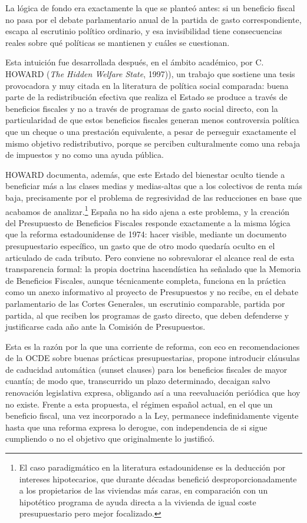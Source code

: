 \documentclass[10pt,a4paper]{article}
\newcounter{anexo}
\begin{document}
La lógica de fondo era exactamente la que se planteó antes: si un beneficio fiscal no pasa por el debate parlamentario anual de la partida de gasto correspondiente, escapa al escrutinio político ordinario, y esa invisibilidad tiene consecuencias reales sobre qué políticas se mantienen y cuáles se cuestionan.

Esta intuición fue desarrollada después, en el ámbito académico, por C. HOWARD (\textit{The Hidden Welfare State}, 1997)), un trabajo que sostiene una tesis provocadora y muy citada en la literatura de política social comparada: buena parte de la redistribución efectiva que realiza el Estado se produce a través de beneficios fiscales y no a través de programas de gasto social directo, con la particularidad de que estos beneficios fiscales generan menos controversia política que un cheque o una prestación equivalente, a pesar de perseguir exactamente el mismo objetivo redistributivo, porque se perciben culturalmente como una rebaja de impuestos y no como una ayuda pública.

HOWARD documenta, además, que este Estado del bienestar oculto tiende a beneficiar más a las clases medias y medias-altas que a los colectivos de renta más baja, precisamente por el problema de regresividad de las reducciones en base que acabamos de analizar.\footnote{%
    El caso paradigmático en la literatura estadounidense es la deducción por intereses hipotecarios, que durante décadas benefició desproporcionadamente a los propietarios de las viviendas más caras, en comparación con un hipotético programa de ayuda directa a la vivienda de igual coste presupuestario pero mejor focalizado.
} España no ha sido ajena a este problema, y la creación del Presupuesto de Beneficios Fiscales responde exactamente a la misma lógica que la reforma estadounidense de 1974: hacer visible, mediante un documento presupuestario específico, un gasto que de otro modo quedaría oculto en el articulado de cada tributo. Pero conviene no sobrevalorar el alcance real de esta transparencia formal: la propia doctrina hacendística ha señalado que la Memoria de Beneficios Fiscales, aunque técnicamente completa, funciona en la práctica como un anexo informativo al proyecto de Presupuestos y no recibe, en el debate parlamentario de las Cortes Generales, un escrutinio comparable, partida por partida, al que reciben los programas de gasto directo, que deben defenderse y justificarse cada año ante la Comisión de Presupuestos. 

Esta es la razón por la que una corriente de reforma, con eco en recomendaciones de la OCDE sobre buenas prácticas presupuestarias, propone introducir cláusulas de caducidad automática (sunset clauses) para los beneficios fiscales de mayor cuantía; de modo que, transcurrido un plazo determinado, decaigan salvo renovación legislativa expresa, obligando así a una reevaluación periódica que hoy no existe. Frente a esta propuesta, el régimen español actual, en el que un beneficio fiscal, una vez incorporado a la Ley, permanece indefinidamente vigente hasta que una reforma expresa lo derogue, con independencia de si sigue cumpliendo o no el objetivo que originalmente lo justificó.
\end{document}
